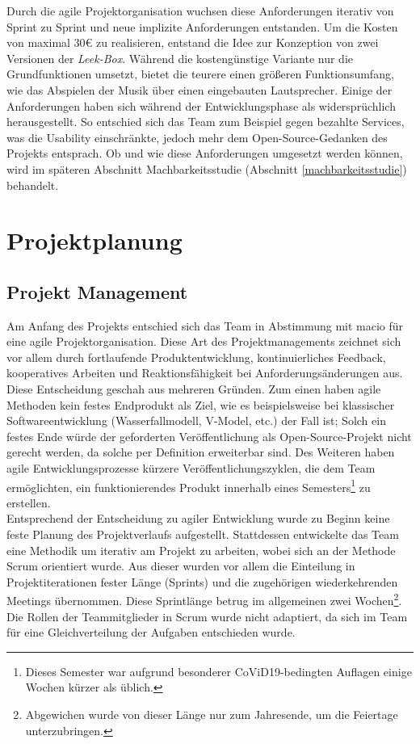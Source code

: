 \documentclass[10pt, a4paper]{article}
\begin{document}
\begin{onehalfspace}
Durch die agile Projektorganisation wuchsen diese Anforderungen iterativ von Sprint zu Sprint und neue implizite Anforderungen entstanden.
Um die Kosten von maximal 30€ zu realisieren, entstand die Idee zur Konzeption von zwei Versionen der \textit{Leek-Box}. Während die kostengünstige Variante nur die Grundfunktionen umsetzt, bietet die teurere einen größeren Funktionsumfang, wie das Abspielen der Musik über einen eingebauten Lautsprecher.
Einige der Anforderungen haben sich während der Entwicklungsphase als widersprüchlich herausgestellt.
So entschied sich das Team zum Beispiel gegen bezahlte Services, was die Usability einschränkte, jedoch mehr dem Open-Source-Gedanken des Projekts entsprach.
Ob und wie diese Anforderungen umgesetzt werden können, wird im späteren Abschnitt Machbarkeitsstudie (Abschnitt \ref{machbarkeitsstudie}) behandelt.

\section{Projektplanung}
  \subsection{Projekt Management}
  Am Anfang des Projekts entschied sich das Team in Abstimmung mit macio für eine agile Projektorganisation.
  Diese Art des Projektmanagements zeichnet sich vor allem durch fortlaufende Produktentwicklung, kontinuierliches Feedback, kooperatives Arbeiten und
  Reaktionsfähigkeit bei Anforderungsänderungen aus. Diese Entscheidung geschah aus mehreren Gründen.
  Zum einen haben agile Methoden kein festes Endprodukt als Ziel, wie es beispielsweise bei klassischer Softwareentwicklung
  (Wasserfallmodell, V-Model, etc.) der Fall ist; Solch ein festes Ende würde der geforderten Veröffentlichung als Open-Source-Projekt nicht gerecht werden,
  da solche per Definition erweiterbar sind. Des Weiteren haben agile Entwicklungsprozesse kürzere Veröffentlichungszyklen,
  die dem Team ermöglichten, ein funktionierendes Produkt innerhalb eines
  Semesters\footnote{Dieses Semester war aufgrund besonderer CoViD19-bedingten Auflagen einige Wochen kürzer als üblich.} zu erstellen.
  \\
  Entsprechend der Entscheidung zu agiler Entwicklung wurde zu Beginn keine feste Planung des Projektverlaufs aufgestellt.
  Stattdessen entwickelte das Team eine Methodik um iterativ am Projekt zu arbeiten, wobei sich an der Methode Scrum orientiert wurde.
  Aus dieser wurden vor allem die Einteilung in Projektiterationen fester Länge (Sprints) und die zugehörigen wiederkehrenden Meetings übernommen.
  Diese Sprintlänge betrug im allgemeinen zwei Wochen\footnote{Abgewichen wurde von dieser Länge nur zum Jahresende, um die Feiertage unterzubringen.}.
  Die Rollen der Teammitglieder in Scrum wurde nicht adaptiert, da sich im Team für eine Gleichverteilung der Aufgaben entschieden wurde.


\end{onehalfspace}
\end{document}
